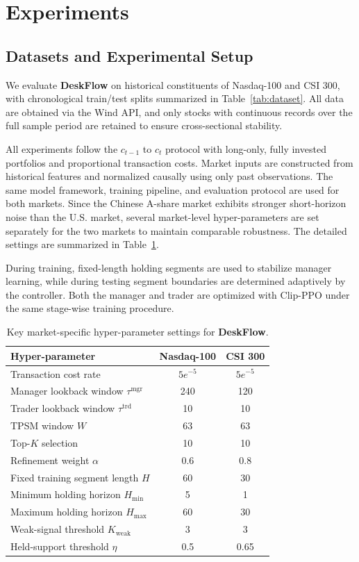 \documentclass[letterpaper]{article} %
\begin{document}
\section{Experiments}
\subsection{Datasets and Experimental Setup}

We evaluate \textbf{\textbf{DeskFlow}} on historical constituents of Nasdaq-100 and CSI 300, with chronological train/test splits summarized in Table~\ref{tab:dataset}. All data are obtained via the Wind API, and only stocks with continuous records over the full sample period are retained to ensure cross-sectional stability.

All experiments follow the $c_{t-1}$ to $c_{t}$ protocol with long-only, fully invested portfolios and proportional transaction costs. Market inputs are constructed from historical features and normalized causally using only past observations. The same model framework, training pipeline, and evaluation protocol are used for both markets. Since the Chinese A-share market exhibits stronger short-horizon noise than the U.S. market, several market-level hyper-parameters are set separately for the two markets to maintain comparable robustness. The detailed settings are summarized in Table~\ref{tab:hyperparam}.

During training, fixed-length holding segments are used to stabilize manager learning, while during testing segment boundaries are determined adaptively by the controller. Both the manager and trader are optimized with Clip-PPO under the same stage-wise training procedure.

\begin{table}[t]
\centering
\caption{Key market-specific hyper-parameter settings for \textbf{DeskFlow}.}
\label{tab:hyperparam}
\small
\setlength{\tabcolsep}{6pt}
\begin{tabular}{lcc}
\hline
\textbf{Hyper-parameter} & \textbf{Nasdaq-100} & \textbf{CSI 300} \\
\hline
Transaction cost rate & $5e^{-5}$ & $5e^{-5}$ \\
Manager lookback window \(\tau^{\mathrm{mgr}}\) & 240 & 120 \\
Trader lookback window \(\tau^{\mathrm{trd}}\) & 10 & 10 \\
TPSM window \(W\) & 63 & 63 \\
Top-\(K\) selection & 10 & 10 \\
Refinement weight \(\alpha\) & 0.6 & 0.8 \\
Fixed training segment length \(H\) & 60 & 30 \\
Minimum holding horizon \(H_{\min}\) & 5 & 1 \\
Maximum holding horizon \(H_{\max}\) & 60 & 30 \\
Weak-signal threshold \(K_{\mathrm{weak}}\) & 3 & 3 \\
Held-support threshold \(\eta\) & 0.5 & 0.65 \\
\hline
\end{tabular}
\end{table}
\end{document}
